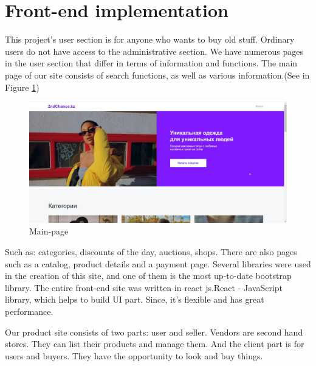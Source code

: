 \section{Front-end implementation}
This project's user section is for anyone who wants to buy old stuff. Ordinary users do not have access to the administrative section. We have numerous pages in the user section that differ in terms of information and functions. The main page of our site consists of search functions, as well as various information.(See in Figure \ref{fig:front-end})
\begin{figure}[h!]
    \centering
    \includegraphics[scale=0.6]{figures/front-end.jpg}
    \caption{Main-page}
    \label{fig:front-end}
\end{figure}

Such as: categories, discounts of the day, auctions, shops. There are also pages such as a catalog, product details and a payment page. Several libraries were used in the creation of this site, and one of them is the most up-to-date bootstrap library. The entire front-end site was written in react js.React - JavaScript library, which helps to build UI part. Since, it's flexible and has great performance\cite{react}.

Our product site consists of two parts: user and seller. Vendors are second hand stores. They can list their products and manage them. And the client part is for users and buyers. They have the opportunity to look and buy things.
